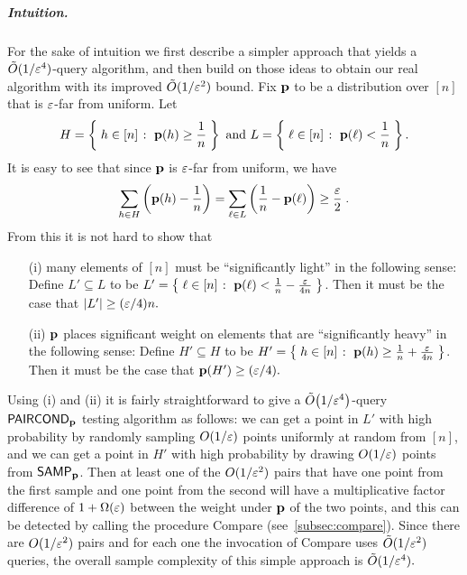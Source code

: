 \subparagraph{Intuition.}  For the sake of intuition we first
describe a simpler approach that yields a $\tilde{O}(1/\varepsilon^4)$-query
algorithm, and then build on those ideas to obtain our real algorithm with
its improved $\tilde{O}(1/\varepsilon^2)$ bound.
Fix $\mathbf{p}$ to be a distribution over $[n]$
that is $\varepsilon$-far from uniform.  Let
\[
H = \left\{\;  h  \in [n] \;\colon\;  \mathbf{p}(h) \geq \frac{1}{n} \; \right\}
\text{~and~}
L = \left\{\;  \ell  \in [n] \;\colon\;  \mathbf{p}(\ell) < \frac{1}{n} \; \right\}.
\]
It is easy to see that since $\mathbf{p}$ is $\varepsilon$-far from uniform, we have
\begin{equation}\label{eq:eps-far1}
\sum_{h\in H} \left( \mathbf{p}(h) - \frac{1}{n} \right) =
\sum_{\ell\in L} \left( \frac{1}{n} - \mathbf{p}(\ell) \right)
\geq \frac{\varepsilon}{2}\;.
\end{equation}
From this it is not hard to show that

\begin{itemize}

\item [(i)] many elements of $[n]$ must be ``significantly light'' in the
following sense:  Define $L' \subseteq L$ to be $L' = \left\{\;  \ell
\in [n] \;\colon\; \mathbf{p}(\ell) < \frac{1}{n} - {\frac{\varepsilon}{4n}}\; \right\}$.  Then
it must be the case that $|L'| \geq (\varepsilon/4)n.$

\item [(ii)] $\mathbf{p}$ places significant weight on elements that are
``significantly heavy'' in the following sense:  Define $H' \subseteq H$
to be  $H' = \left\{\;  h
\in [n] \;\colon\; \mathbf{p}(h) \geq \frac{1}{n} + {\frac{\varepsilon}{4n}}\; \right\}$.  Then
it must be the case that $\mathbf{p}(H') \geq (\varepsilon/4).$

\end{itemize}

Using (i) and (ii) it is fairly straightforward to give a
$\tildeO{ 1/\eps^4 }$-query ${\sf PAIRCOND}_{\mathbf{p}}$ testing algorithm as follows:
we can get a point in $L'$ with high probability by
randomly sampling $O(1/\varepsilon)$ points uniformly at random from $[n]$,
and we can get a point in $H'$ with high probability by drawing
$O(1/\varepsilon)$ points from ${\sf SAMP}_{\mathbf{p}}$.
Then at least one of the $O(1/\varepsilon^2)$ pairs that have
one point from the first sample and one point from the second will have
a multiplicative factor difference of $1 + \Omega(\varepsilon)$ between the
weight under $\mathbf{p}$ of the two points, and this can be detected
by calling the procedure {\sc Compare} (see~\cref{subsec:compare}).
Since there are $O(1/\varepsilon^2)$ pairs and for each one the invocation of
{\sc Compare} uses $\tilde{O}(1/\varepsilon^2)$ queries,
the overall sample complexity of this simple approach is $
\tilde{O}(1/\varepsilon^4).$

